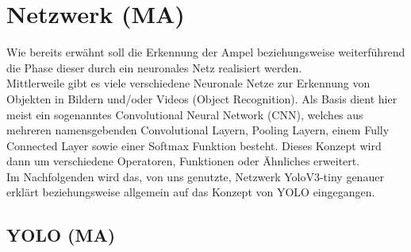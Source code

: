 \documentclass[a4paper,oneside,12pt]{report}
\begin{document}
	\chapter{Netzwerk (MA)}
	\begin{onehalfspace}
		Wie bereits erwähnt soll die Erkennung der Ampel beziehungsweise weiterführend die Phase dieser durch ein neuronales Netz realisiert werden.\\
		Mittlerweile gibt es viele verschiedene Neuronale Netze zur Erkennung von Objekten in Bildern und/oder Videos (Object Recognition). Als Basis dient hier meist ein sogenanntes Convolutional Neural Network (CNN), welches aus mehreren namensgebenden Convolutional Layern, Pooling Layern, einem Fully Connected Layer sowie einer Softmax Funktion besteht.
		Dieses Konzept wird dann um verschiedene Operatoren, Funktionen oder Ähnliches erweitert.\\
		Im Nachfolgenden wird das, von uns genutzte, Netzwerk YoloV3-tiny genauer erklärt beziehungsweise allgemein auf das Konzept von YOLO eingegangen.
		\section{YOLO (MA)}

\end{onehalfspace}
\end{document}
